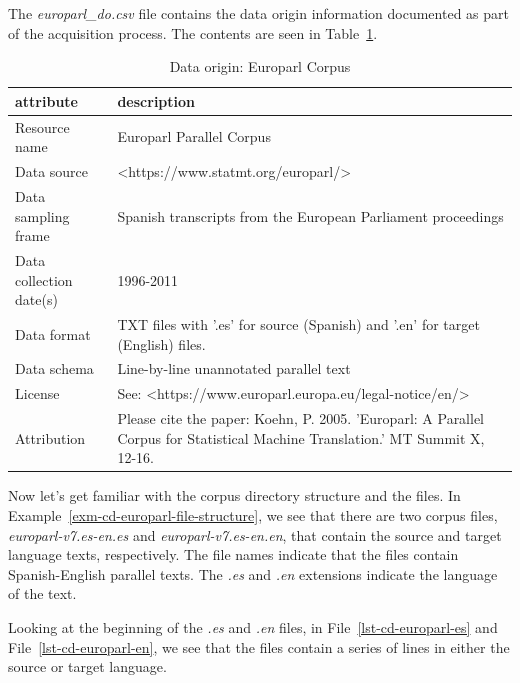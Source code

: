 \documentclass[
  letterpaper,
  DIV=11,
  numbers=noendperiod]{scrreport}
\theoremstyle{definition}
\theoremstyle{remark}
\begin{document}
The \emph{europarl\_do.csv} file contains the data origin information
documented as part of the acquisition process. The contents are seen in
Table~\ref{tbl-cd-europarl-data-origin}.

\hypertarget{tbl-cd-europarl-data-origin}{}
\begin{table}
\caption{\label{tbl-cd-europarl-data-origin}Data origin: Europarl Corpus }\tabularnewline

\centering
\begin{tabular}{l|l}
\hline
attribute & description\\
\hline
Resource name & Europarl Parallel Corpus\\
\hline
Data source & <https://www.statmt.org/europarl/>\\
\hline
Data sampling frame & Spanish transcripts from the European Parliament proceedings\\
\hline
Data collection date(s) & 1996-2011\\
\hline
Data format & TXT files with '.es' for source (Spanish) and '.en' for target (English) files.\\
\hline
Data schema & Line-by-line unannotated parallel text\\
\hline
License & See: <https://www.europarl.europa.eu/legal-notice/en/>\\
\hline
Attribution & Please cite the paper: Koehn, P. 2005. 'Europarl: A Parallel Corpus for Statistical Machine Translation.' MT Summit X, 12-16.\\
\hline
\end{tabular}
\end{table}

Now let's get familiar with the corpus directory structure and the
files. In Example~\ref{exm-cd-europarl-file-structure}, we see that
there are two corpus files, \emph{europarl-v7.es-en.es} and
\emph{europarl-v7.es-en.en}, that contain the source and target language
texts, respectively. The file names indicate that the files contain
Spanish-English parallel texts. The \emph{.es} and \emph{.en} extensions
indicate the language of the text.

Looking at the beginning of the \emph{.es} and \emph{.en} files, in
File~\ref{lst-cd-europarl-es} and File~\ref{lst-cd-europarl-en}, we see
that the files contain a series of lines in either the source or target
language.
\end{document}
